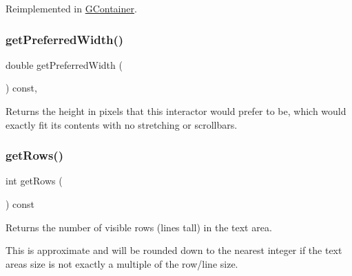 Reimplemented in \mbox{\hyperlink{classsgl_1_1GContainer_ac0fd6fc35681f935c67ad68078b354b8}{G\+Container}}.

\mbox{\label{classsgl_1_1GInteractor_a82bca31d37700fb0e35d2743352efd5e}} 
\subsubsection{\texorpdfstring{get\+Preferred\+Width()}{getPreferredWidth()}}
{\footnotesize\ttfamily double get\+Preferred\+Width (\begin{DoxyParamCaption}{ }\end{DoxyParamCaption}) const\hspace{0.3cm}{\ttfamily [virtual]}, {\ttfamily [inherited]}}



Returns the height in pixels that this interactor would prefer to be, which would exactly fit its contents with no stretching or scrollbars. 

\mbox{\label{classsgl_1_1GTextArea_ad343f9bbb050d9037167e80e423ab4e8}} 
\subsubsection{\texorpdfstring{get\+Rows()}{getRows()}}
{\footnotesize\ttfamily int get\+Rows (\begin{DoxyParamCaption}{ }\end{DoxyParamCaption}) const\hspace{0.3cm}{\ttfamily [virtual]}}



Returns the number of visible rows (lines tall) in the text area. 

This is approximate and will be rounded down to the nearest integer if the text area\textquotesingle{}s size is not exactly a multiple of the row/line size. \mbox{\label{classsgl_1_1GTextArea_a512371b3f41599349f23389825a6ccf7}} 
